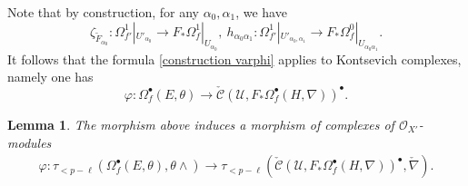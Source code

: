 \documentclass[12pt, a4paper]{article}
\newtheorem{lemma}{Lemma}[section]
\begin{document}
Note that by construction, for any $\alpha_0,\alpha_1$, we have
$$
\zeta_{\tilde F_{\alpha_0}}:\Omega^1_{f'}|_{U'_{\alpha_0}}\to F_*\Omega^1_f|_{U_{\alpha_0}},~h_{\alpha_0\alpha_1}:\Omega^1_{f'}|_{U'_{\alpha_0,\alpha_1}}\to F_*\Omega^0_f|_{U_{\alpha_0\alpha_1}}.$$
It follows that the formula \eqref{construction varphi} applies to Kontsevich complexes, namely one has
$$
\varphi:\Omega_f^\bullet(E,\theta)\to\check{\mathcal C}(\mathcal U,F_*\Omega_f^\bullet(H,\nabla))^\bullet.
$$
\begin{lemma}
The morphism above induces a morphism of complexes of $\mathcal O_{X'}$-modules
\begin{eqnarray}\label{Kontsevich varphi}
\varphi:\tau_{<p-\ell}(\Omega_f^\bullet(E,\theta),\theta\wedge)\to\tau_{<p-\ell}(\check{\mathcal C}(\mathcal U,F_*\Omega_f^\bullet(H,\nabla))^\bullet,\check\nabla).
\end{eqnarray}
\end{lemma}
\end{document}
